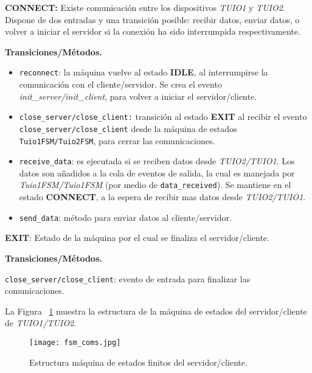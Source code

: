 \textbf{CONNECT:} Existe comunicación entre los dispositivos \emph{TUIO1} y \emph{TUIO2}. 
Dispone de dos entradas y una transición posible: recibir datos, enviar datos, o volver a iniciar el servidor si la conexión ha sido interrumpida respectivamente.

\textbf{Transiciones/Métodos.}
\begin{itemize}
\item \texttt{reconnect}: la máquina vuelve al estado \textbf{IDLE}, al interrumpirse la comunicación con el cliente/servidor. Se crea el evento \emph{init\_server/init\_client}, para volver a iniciar el servidor/cliente.
\item \texttt{close\_server/close\_client:} transición al estado \textbf{EXIT} al recibir el evento \texttt{close\_server/close\_client} desde la máquina de estados \texttt{Tuio1FSM/Tuio2FSM}, para cerrar las comunicaciones.
\item \texttt{receive\_data}: es ejecutada si se reciben datos desde \emph{TUIO2/TUIO1}. Los datos son añadidos a la cola de eventos de salida, la cual es manejada por \emph{Tuio1FSM/Tuio1FSM} (por medio de \texttt{data\_received}). Se mantiene en el estado \textbf{CONNECT}, a la espera de recibir mas datos desde \emph{TUIO2/TUIO1}.
\item \texttt{send\_data}: método para enviar datos al cliente/servidor.
\end{itemize}
\textbf{EXIT}: Estado de la máquina por el cual se finaliza el servidor/cliente.

\textbf{Transiciones/Métodos.}

\texttt{close\_server/close\_client}: evento de entrada para finalizar las comunicaciones.


La Figura ~\ref{fig:fsmcoms} muestra la estructura de la máquina de estados del servidor/cliente de \emph{TUIO1/TUIO2}.

\begin{figure}[!h]
\begin{center}
\texttt{[image: fsm\_coms.jpg]}
\caption{Estructura máquina de estados finitos del servidor/cliente.}
\label{fig:fsmcoms}
\end{center}
\end{figure}


